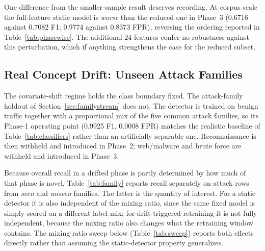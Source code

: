 \documentclass[11pt,a4paper]{article}
\begin{document}
One difference from the smaller-sample result deserves recording. At corpus
scale the full-feature static model is \emph{worse} than the reduced one in
Phase~3 (0.6716 against 0.7082 F1; 0.9774 against 0.8373 FPR), reversing the
ordering reported in Table~\ref{tab:phasewise}. The additional 24 features
confer no robustness against this perturbation, which if anything strengthens
the case for the reduced subset.

\subsection{Real Concept Drift: Unseen Attack Families}
\label{sec:family}

The covariate-shift regime holds the class boundary fixed. The attack-family
holdout of Section~\ref{sec:familystream} does not. The detector is trained on
benign traffic together with a proportional mix of the five common attack
families, so its Phase-1 operating point (0.9925 F1, 0.0008 FPR) matches the
realistic baseline of Table~\ref{tab:classifiers} rather than an artificially
separable one. Reconnaissance is then withheld and introduced in Phase~2;
web/malware and brute force are withheld and introduced in Phase~3.

Because overall recall in a drifted phase is partly determined by how much of
that phase is novel, Table~\ref{tab:family} reports recall separately on attack
rows from \emph{seen} and \emph{unseen} families. The latter is the quantity of
interest. For a static detector it is also independent of the mixing ratio,
since the same fixed model is simply scored on a different label mix; for
drift-triggered retraining it is not fully independent, because the mixing
ratio also changes what the retraining window contains. The mixing-ratio
sweep below (Table~\ref{tab:sweep}) reports both effects directly rather than
assuming the static-detector property generalizes.
\end{document}
